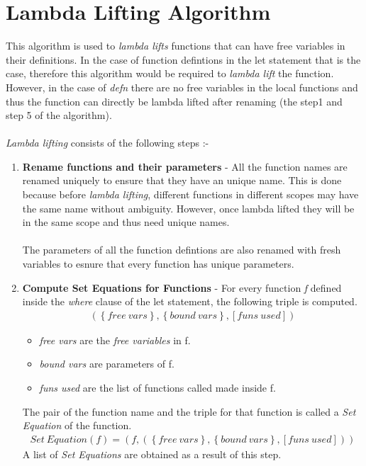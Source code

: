 \documentclass[11pt]{article}
\begin{document}
\section{Lambda Lifting Algorithm}\label{LamLiftAlg}
This algorithm is used to {\em lambda lifts} functions that can have free variables in their definitions. In the case of function defintions in the {\sf let} statement that is the case, therefore this algorithm would be required to {\em lambda lift} the function. However, in the case of {\em defn} there are no free variables in the local functions and thus the function can directly be lambda lifted after renaming (the step1 and step 5 of the algorithm). 
~~\\~\\ 
{\em Lambda lifting} consists of the following steps :-
\begin{enumerate}
    \item {\bf Rename functions and their parameters} - 
    All the function names are renamed uniquely to ensure that they have an unique name. This is done because before {\em lambda lifting}, different functions in different scopes may have the same name without ambiguity. However, once lambda lifted they will be in the same scope and thus need unique names.
    ~~\\~~\\ 
    The parameters of all the function defintions are also renamed with fresh variables to esnure that every function has unique parameters.
    \item {\bf Compute Set Equations for Functions} -
    For every function {\em f} defined inside the {\em where} clause of the {\sf let} statement, the following triple is computed.
    \begin{align*}
    (\left\{free~vars\right\},\left\{bound~vars\right\},[funs~used])
    \end{align*}
    \begin{itemize}
        \item {\em free vars}  are the {\em free variables} in f.
        \item {\em bound vars} are parameters of f. 
        \item {\em funs used}  are the list of functions called made inside f.
    \end{itemize}
    The pair of the function name and the triple for that function is called a {\em Set Equation} of the function.
    \begin{align*}
        Set~Equation (f) = (f,(\left\{free~vars\right\},\left\{bound~vars\right\},[funs~used]))
    \end{align*}
    A list of {\em Set Equations} are obtained as a result of this step. 
    

\end{enumerate}
\end{document}
